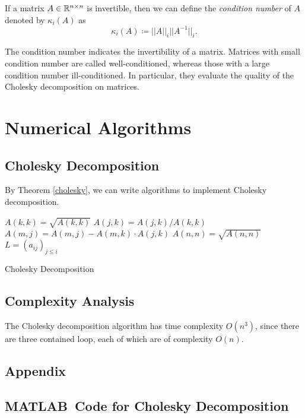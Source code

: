 \begin{definition}
If a matrix \(A\in\mathbb{R}^{n\times n}\) is invertible, then we can define the \emph{condition number} of $A$ denoted by \(\kappa_i(A)\) as
\begin{equation}
\kappa_i(A)\coloneqq||A||_i||A^{-1}||_i.
\end{equation}
\end{definition}
The condition number indicates the invertibility of a matrix.
Matrices with small condition number are called well-conditioned, whereas
those with a large condition number ill-conditioned.
In particular, they evaluate the quality of the Cholesky decomposition on matrices.
\cite{tam39}




\section{Numerical Algorithms}

\subsection{Cholesky Decomposition}
By Theorem \ref{cholesky}, we can write algorithms to implement Cholesky decomposition.
\begin{algorithm}[h]
		{
			\(A(k,k)=\sqrt{A(k,k)}\)\;
			{
				\(A(j,k)=A(j,k)/A(k,k)\)\;
			}
			{
				{
					\(A(m,j)=A(m,j)-A(m,k)\cdot A(j,k)\)\;
				}
			}
		}
		\(A(n,n)=\sqrt{A(n,n)}\)\;
		\(L=(a_{ij})_{j\leq i}\)\;
		\caption{Cholesky Decomposition\cite{tam37}}
\end{algorithm}

\subsection{Complexity Analysis}
The Cholesky decomposition algorithm has time complexity \(O\left(n^3\right)\), since there are three contained loop, each of which are of complexity \(O(n)\).


\newpage
\begin{appendices}
\section{Appendix}
\subsection{MATLAB\texttrademark\ Code for Cholesky Decomposition}

\end{appendices}